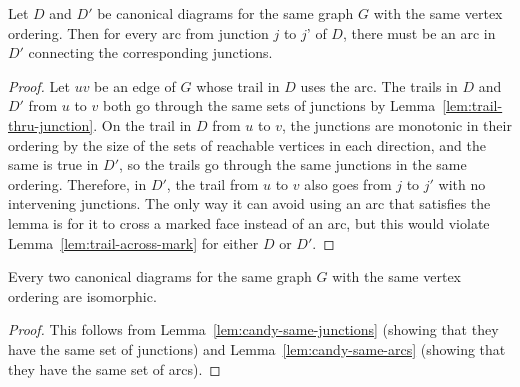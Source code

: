 \documentclass{llncs}
\begin{document}
\begin{lemma}
\label{lem:candy-same-arcs}
Let $D$ and $D'$ be canonical diagrams for the same graph $G$ with the same vertex ordering.
Then for every arc from junction $j$ to $j$' of $D$, there must be an arc in $D'$ connecting the corresponding junctions.
\end{lemma}

\begin{proof}
Let $uv$ be an edge of $G$ whose trail in $D$ uses the arc.
The trails in $D$ and $D'$ from $u$ to $v$ both go through the same sets of junctions by Lemma~\ref{lem:trail-thru-junction}.
On the trail in $D$ from $u$ to $v$, the junctions are monotonic in their ordering
by the size of the sets of reachable vertices in each direction, and the same is true in $D'$, so the trails go through the same junctions in the same ordering.
Therefore, in $D'$, the trail from $u$ to $v$ also goes from $j$ to $j'$ with no intervening junctions.
The only way it can avoid using an arc that satisfies the lemma is for it to cross a marked face instead of an arc, but this would violate Lemma~\ref{lem:trail-across-mark} for either $D$ or $D'$.
\end{proof}

\begin{theorem}
Every two canonical diagrams for the same graph $G$ with the same vertex ordering are isomorphic.
\end{theorem}

\begin{proof}
This follows from Lemma~\ref{lem:candy-same-junctions} (showing that they have the same set of junctions) and Lemma~\ref{lem:candy-same-arcs} (showing that they have the same set of arcs).
\end{proof}
\end{document}
